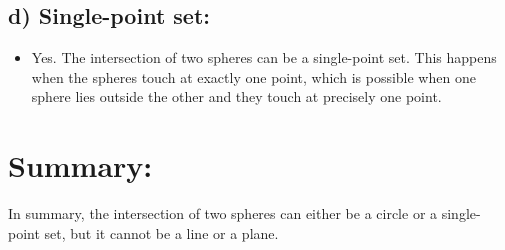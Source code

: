 \documentclass[a4paper,12pt]{article}
\begin{document}
\subsection*{d) Single-point set:}
\begin{itemize}
    \item Yes. The intersection of two spheres can be a single-point set. This happens when the spheres touch at exactly one point, which is possible when one sphere lies outside the other and they touch at precisely one point.
\end{itemize}

\section*{Summary:}
In summary, the intersection of two spheres can either be a circle or a single-point set, but it cannot be a line or a plane.
\end{document}
